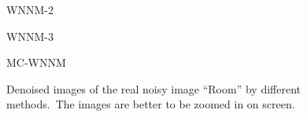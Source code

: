 \begin{figure}
{\begin{minipage}[t]{0.19\textwidth}
{\footnotesize WNNM-2 }
\end{minipage}
\begin{minipage}[t]{0.19\textwidth}
\centering
{}
{\footnotesize WNNM-3 }
\end{minipage}
\begin{minipage}[t]{0.19\textwidth}
\centering
{}
{\footnotesize MC-WNNM }
\end{minipage}
}
    \caption{Denoised images of the real noisy image ``Room'' \cite{ncwebsite} by different methods.\ The images are better to be zoomed in on screen.}
    \label{fig4-12}
\end{figure}
